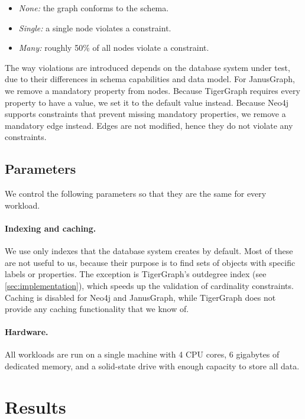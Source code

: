 \documentclass{report}
\theoremstyle{definition}
\begin{document}
\begin{itemize}
  \item \emph{None:} the graph conforms to the schema.
  \item \emph{Single:} a single node violates a constraint.
  \item \emph{Many:} roughly 50\% of all nodes violate a constraint.
\end{itemize}

The way violations are introduced depends on the database system under test, due to their differences in schema capabilities and data model. For JanusGraph, we remove a mandatory property from nodes. Because TigerGraph requires every property to have a value, we set it to the default value instead. Because Neo4j supports constraints that prevent missing mandatory properties, we remove a mandatory edge instead. Edges are not modified, hence they do not violate any constraints.

\subsection{Parameters}

We control the following parameters so that they are the same for every workload.

\paragraph{Indexing and caching.} We use only indexes that the database system creates by default. Most of these are not useful to us, because their purpose is to find sets of objects with specific labels or properties. The exception is TigerGraph's outdegree index (see \autoref{sec:implementation}), which speeds up the validation of cardinality constraints. Caching is disabled for Neo4j and JanusGraph, while TigerGraph does not provide any caching functionality that we know of.

\paragraph{Hardware.} All workloads are run on a single machine with 4 CPU cores, 6 gigabytes of dedicated memory, and a solid-state drive with enough capacity to store all data.

\section{Results}
\end{document}
